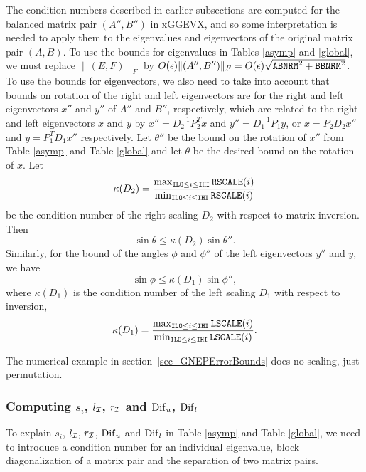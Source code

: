 The condition numbers
described in earlier subsections are computed
for the balanced matrix pair $(A'',B'')$ in xGGEVX,  and so
some interpretation is needed to apply them to the eigenvalues
and eigenvectors of the original matrix pair $(A, B)$.
To use the bounds for eigenvalues in Tables \ref{asymp} and \ref{global},
we must replace $\|(E,F)\|_F$ by
$O(\epsilon)\|(A'',B'')\|_F =
O(\epsilon)\sqrt{ {\tt ABNRM}^2 + {\tt BBNRM}^2 }$.
To use the bounds for eigenvectors, we also need to take
into account that bounds on rotation of the right and left eigenvectors
are for the right and left eigenvectors $x''$ and $y''$ of
$A''$ and $B''$, respectively, which are related to
the right and left eigenvectors $x$ and $y$ by
$x'' = D^{-1}_2 P^T_2 x$ and $y'' = D^{-1}_1 P_1 y$,
or $x = P_2 D_2 x''$ and $y = P^T_1 D_1 x''$ respectively.
Let $\theta''$ be the bound on the rotation of $x''$
from Table \ref{asymp} and Table \ref{global} and
let $\theta$ be the desired bound on the rotation of $x$. Let
\[
\kappa(D_2)=\frac{ \max_{ {\tt ILO} \leq i \leq {\tt IHI} } {\tt RSCALE}(i) }
                 { \min_{ {\tt ILO} \leq i \leq {\tt IHI} } {\tt RSCALE}(i) }
\]
be the condition number of the right scaling $D_2$ with respect
to matrix inversion. Then
\[
\sin \theta \leq \kappa(D_2) \sin\theta''.
\]
Similarly, for the bound of the angles $\phi$ and $\phi''$ of the
left eigenvectors $y''$ and $y$, we have
\[
\sin \phi \leq \kappa(D_1) \sin \phi'',
\]
where $\kappa(D_1)$ is the condition number of the left
scaling $D_1$ with respect to inversion,
\[
\kappa(D_1)=\frac{ \max_{ {\tt ILO} \leq i \leq {\tt IHI} } {\tt LSCALE}(i) }
                 { \min_{ {\tt ILO} \leq i \leq {\tt IHI} } {\tt LSCALE}(i) }.
\]

The numerical example in section~\ref{sec_GNEPErrorBounds}
does no scaling, just permutation.

\subsubsection{Computing $s_i$, $l_{\cal I}$, $r_{\cal I}$ and
${\rm Dif}_u$, ${\rm Dif}_l$}\label{GNEP33}

To explain $s_i$, $l_{\cal I}$, $r_{\cal I}$,
${\rm Dif}_u$ and ${\rm Dif}_l$
in Table \ref{asymp} and Table \ref{global},
we need to introduce a condition number for an individual eigenvalue,
block diagonalization of a matrix pair and
the separation of two matrix pairs.

